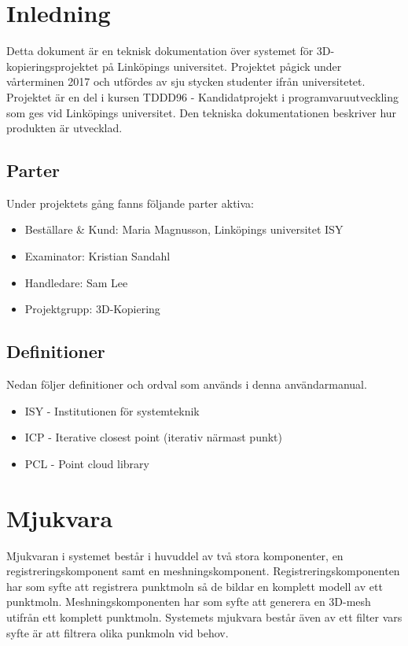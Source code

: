 \documentclass[a4paper,titlepage,12pt]{article}
\begin{document}
\section{Inledning}
	Detta dokument är en teknisk dokumentation över systemet för 3D-kopieringsprojektet på Linköpings universitet. Projektet pågick under vårterminen 2017 och utfördes av sju stycken studenter ifrån universitetet. Projektet är en del i kursen TDDD96 - Kandidatprojekt i programvaruutveckling som ges vid Linköpings universitet. Den tekniska dokumentationen beskriver hur produkten är utvecklad.
	\subsection{Parter}
		Under projektets gång fanns följande parter aktiva:
		
		\begin{itemize}
			\item Beställare \& Kund: Maria Magnusson, Linköpings universitet ISY
			\item Examinator: Kristian Sandahl
			\item Handledare: Sam Lee
			\item Projektgrupp: 3D-Kopiering
		\end{itemize}
		
	\subsection{Definitioner}
		Nedan följer definitioner och ordval som används i denna användarmanual.
		
		\begin{itemize}
			\item ISY - Institutionen för systemteknik
			\item ICP - Iterative closest point (iterativ närmast punkt)
			\item PCL - Point cloud library
		\end{itemize}
    
\newpage  

\section{Mjukvara}
 	Mjukvaran i systemet består i huvuddel av två stora komponenter, en registreringskomponent samt en meshningskomponent. Registreringskomponenten har som syfte att registrera punktmoln så de bildar en komplett modell av ett punktmoln. Meshningskomponenten har som syfte att generera en 3D-mesh utifrån ett komplett punktmoln. Systemets mjukvara består även av ett filter vars syfte är att filtrera olika punkmoln vid behov.
	
\end{document}
